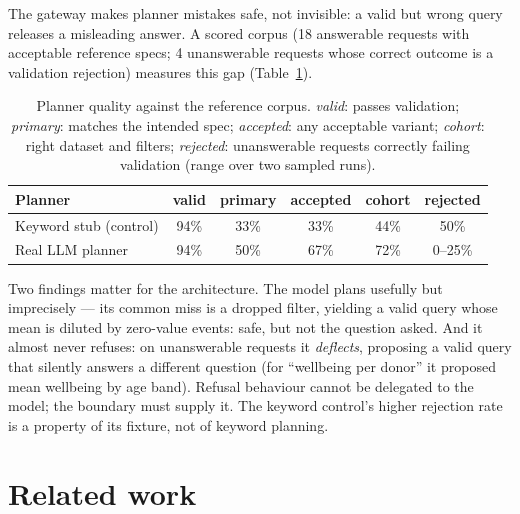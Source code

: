 \documentclass[11pt,a4paper]{article}
\begin{document}
The gateway makes planner mistakes safe, not invisible: a valid but wrong
query releases a misleading answer. A scored corpus (18 answerable requests
with acceptable reference specs; 4 unanswerable requests whose correct outcome
is a validation rejection) measures this gap
(Table~\ref{tab:planner}).

\begin{table}[h]
  \centering
  \small
  \begin{tabular}{lccccc}
    \toprule
    Planner & valid & primary & accepted & cohort & rejected \\
    \midrule
    Keyword stub (control) & 94\% & 33\% & 33\% & 44\% & 50\% \\
    Real LLM planner\footnotemark{} & 94\% & 50\% & 67\% & 72\% & 0--25\% \\
    \bottomrule
  \end{tabular}
  \caption{Planner quality against the reference corpus. \emph{valid}: passes
  validation; \emph{primary}: matches the intended spec; \emph{accepted}: any
  acceptable variant; \emph{cohort}: right dataset and filters; \emph{rejected}:
  unanswerable requests correctly failing validation (range over two sampled
  runs).}
  \label{tab:planner}
\end{table}

Two findings matter for the architecture. The model plans usefully but
imprecisely --- its common miss is a dropped filter, yielding a valid query
whose mean is diluted by zero-value events: safe, but not the question asked.
And it almost never refuses: on unanswerable requests it \emph{deflects},
proposing a valid query that silently answers a different question (for
``wellbeing per donor'' it proposed mean wellbeing by age band). Refusal
behaviour cannot be delegated to the model; the boundary must supply it. The
keyword control's higher rejection rate is a property of its fixture, not of
keyword planning.

\section{Related work}
\end{document}
